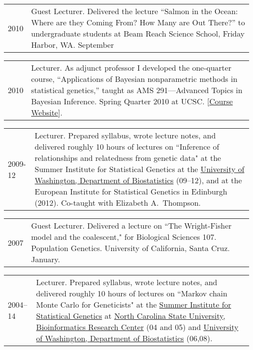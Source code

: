 \documentclass[11pt]{article}
\newlength{\myindent}
\newlength{\scndcol}
\begin{document}
\begin{tabular}{ @{}p{2.5\myindent} p{\scndcol}@{}  }
\hspace*{\myindent}2010 &  Guest Lecturer.  Delivered the lecture ``Salmon in the Ocean: Where are they Coming From? 
How Many are Out There?'' to undergraduate students at Beam Reach Science School, Friday Harbor, WA. September
\end{tabular}


\begin{tabular}{ @{}p{2.5\myindent} p{\scndcol}@{}  }
\hspace*{\myindent}2010 &  Lecturer.  As adjunct professor I developed the one-quarter course, ``Applications of Bayesian nonparametric methods in statistical genetics,'' taught as AMS 291---Advanced Topics in Bayesian Inference.  Spring Quarter 2010 at UCSC.  [\href{http://www.soe.ucsc.edu/classes/ams291/Spring10/}{Course Website}].
\end{tabular}


\begin{tabular}{ @{}p{2.5\myindent} p{\scndcol}@{}  }
\hspace*{\myindent}2009-12 &  Lecturer.  Prepared syllabus, wrote lecture notes, and delivered roughly 10 hours of lectures on ``Inference of relationships and relatedness from genetic data" at the Summer Institute for Statistical Genetics at the \href{http://www.biostat.washington.edu/}{University of Washington, Department of Biostatistics} (09--12), and at the European Institute for Statistical Genetics in Edinburgh (2012). Co-taught with Elizabeth A.~Thompson.
\end{tabular}


\begin{tabular}{ @{}p{2.5\myindent} p{\scndcol}@{}  }
\hspace*{\myindent}2007 &  Guest Lecturer.  Delivered a lecture on ``The Wright-Fisher model and  the coalescent," for Biological Sciences 107. Population Genetics.   University of California, Santa Cruz. January.
\end{tabular}


\begin{tabular}{ @{}p{2.5\myindent} p{\scndcol}@{}  }
\hspace*{\myindent}2004--14 &  Lecturer.  Prepared syllabus, wrote lecture notes, and delivered roughly 10 hours of lectures on ``Markov chain Monte Carlo for Geneticists" at the \href{http://www.biostat.washington.edu/sisg06/}{Summer Institute for Statistical Genetics} at    
\href{http://statgen.ncsu.edu/brcwebsite/home.php}{North Carolina State University, Bioinformatics Research Center} (04 and 05) and \href{http://www.biostat.washington.edu/}{University of Washington, Department of Biostatistics} (06,08).
\end{tabular}
\end{document}
